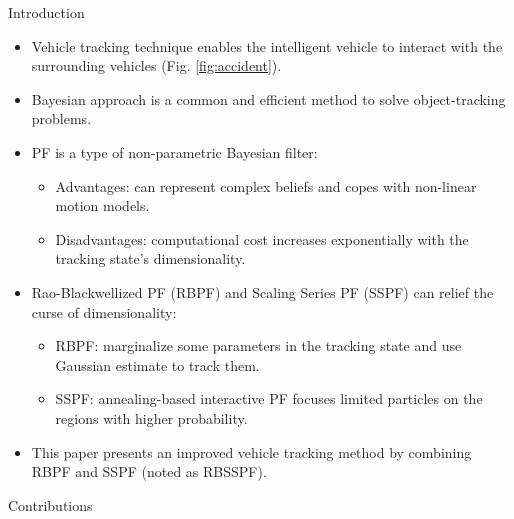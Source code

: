 \documentclass[final,hyperref={pdfpagelabels=false}]{beamer}
\begin{document}
\begin{frame}[t]
\begin{columns}[t]
\begin{column}{0.47\textwidth}
            
\begin{block}{Introduction}

\begin{itemize}
\item Vehicle tracking technique enables the intelligent vehicle to interact with the surrounding vehicles (Fig. \ref{fig:accident}).
\item Bayesian approach is a common and efficient method to solve object-tracking problems.
\item PF is a type of non-parametric Bayesian filter:
\begin{itemize}
	\item Advantages: can represent complex beliefs and copes with non-linear motion models.
	\item Disadvantages: computational cost increases exponentially with the tracking state's dimensionality.
\end{itemize}
\item Rao-Blackwellized PF (RBPF) and Scaling Series PF (SSPF) can relief the curse of dimensionality:
\begin{itemize}
	\item RBPF: marginalize some parameters in the tracking state and use Gaussian estimate to track them.
	\item SSPF: annealing-based interactive PF focuses limited particles on the regions with higher probability.
\end{itemize}
\item This paper presents an improved vehicle tracking method by combining RBPF and SSPF (noted as RBSSPF).
\end{itemize}
\end{block}

\begin{block}{Contributions}


\end{block}
\end{column}
\end{columns}
\end{frame}
\end{document}
